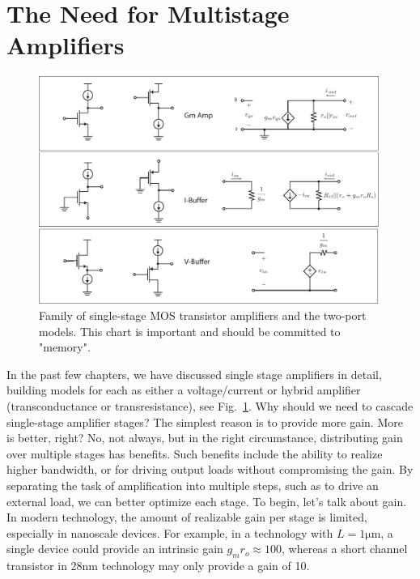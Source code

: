 \section{The Need for Multistage Amplifiers}
\begin{figure}[tb]
\begin{center}
\includegraphics[width=\columnwidth]{ampchart_models}
\end{center}
\caption{Family of single-stage MOS transistor amplifiers and the two-port models.  This chart is important and should be committed to "memory".}
\label{fig:ampchart_models_fig}
\end{figure}
In the past few chapters, we have discussed single stage amplifiers in detail, building models for each as either a voltage/current or hybrid amplifier (transconductance or transresistance), see Fig.~\ref{fig:ampchart_models_fig}.  Why should we need to cascade single-stage amplifier stages?  The simplest reason is to provide more gain.   More is better, right? No, not always, but in the right circumstance, distributing gain over multiple stages has benefits. Such benefits include the ability to realize higher bandwidth, or for driving output loads without compromising the gain.  By separating the task of amplification into multiple steps, such as to drive an external load, we can better optimize each stage.
To begin, let's talk about gain.  In modern technology, the amount of realizable gain per stage is  limited, especially in nanoscale devices.  For example, in a technology with $L = 1\mathrm{\mu m}$, a single device could provide an intrinsic gain $g_m r_o \approx 100$, whereas a short channel transistor in 28nm technology may only provide a gain of 10.  
